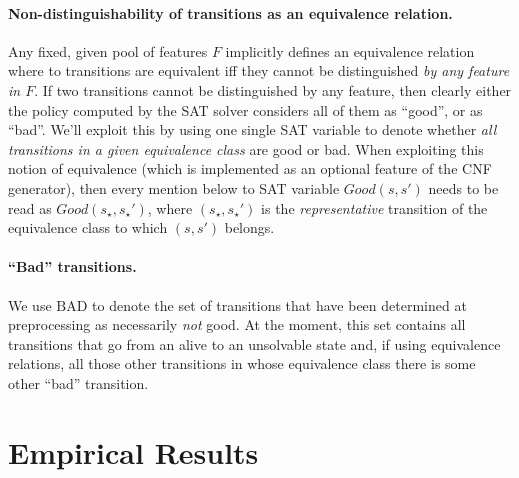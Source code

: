 \documentclass[a4paper]{article}
\newcommand{\badtx}{\ensuremath{\mathrm{BAD}}}
\begin{document}
\paragraph{Non-distinguishability of transitions as an equivalence relation.}
Any fixed, given pool of features $F$ implicitly defines an equivalence relation where to transitions are
equivalent iff they cannot be distinguished \emph{by any feature in $F$}.
If two transitions cannot be distinguished by any feature, then clearly either the policy computed by the SAT solver
considers all of them as ``good'', or as ``bad''.
We'll exploit this by using one single SAT variable to denote whether \emph{all transitions in a given equivalence
class} are good or bad. When exploiting this notion of equivalence (which is implemented as an optional feature of
the CNF generator), then every mention below to SAT variable $Good(s, s')$ needs to be read as $Good(s_{\star}, s_{\star}')$,
where $(s_{\star}, s_{\star}')$ is the \emph{representative} transition of the equivalence class to which $(s, s')$ belongs.

\paragraph{``Bad'' transitions.}
We use \badtx{} to denote the set of transitions that have been determined at preprocessing as necessarily
\emph{not} good.
At the moment, this set contains all transitions that go from an alive to an unsolvable state and, if using
equivalence relations, all those other transitions in whose equivalence class there is some other ``bad'' transition.


\newpage

\section{Empirical Results}




\end{document}
